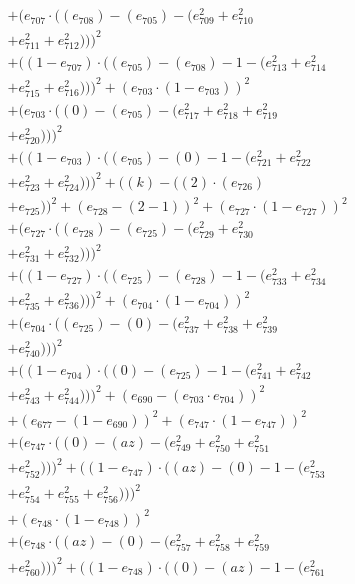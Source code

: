 \documentclass[10pt, a4paper]{article}
\begin{document}
\begin{align*}
& + (e_{707}  \cdot  ((e_{708}) - (e_{705}) - (e_{709}^{2} + e_{710}^{2} \\
& + e_{711}^{2} + e_{712}^{2})))^{2} \\
& + ((1 - e_{707})  \cdot  ((e_{705}) - (e_{708}) - 1 - (e_{713}^{2} + e_{714}^{2} \\
& + e_{715}^{2} + e_{716}^{2})))^{2} + (e_{703}  \cdot  (1 - e_{703}))^{2} \\
& + (e_{703}  \cdot  ((0) - (e_{705}) - (e_{717}^{2} + e_{718}^{2} + e_{719}^{2} \\
& + e_{720}^{2})))^{2} \\
& + ((1 - e_{703})  \cdot  ((e_{705}) - (0) - 1 - (e_{721}^{2} + e_{722}^{2} \\
& + e_{723}^{2} + e_{724}^{2})))^{2} + ((k) - ((2)  \cdot  (e_{726}) \\
& + e_{725}))^{2} + (e_{728} - (2 - 1))^{2} + (e_{727}  \cdot  (1 - e_{727}))^{2} \\
& + (e_{727}  \cdot  ((e_{728}) - (e_{725}) - (e_{729}^{2} + e_{730}^{2} \\
& + e_{731}^{2} + e_{732}^{2})))^{2} \\
& + ((1 - e_{727})  \cdot  ((e_{725}) - (e_{728}) - 1 - (e_{733}^{2} + e_{734}^{2} \\
& + e_{735}^{2} + e_{736}^{2})))^{2} + (e_{704}  \cdot  (1 - e_{704}))^{2} \\
& + (e_{704}  \cdot  ((e_{725}) - (0) - (e_{737}^{2} + e_{738}^{2} + e_{739}^{2} \\
& + e_{740}^{2})))^{2} \\
& + ((1 - e_{704})  \cdot  ((0) - (e_{725}) - 1 - (e_{741}^{2} + e_{742}^{2} \\
& + e_{743}^{2} + e_{744}^{2})))^{2} + (e_{690} - (e_{703}  \cdot  e_{704}))^{2} \\
& + (e_{677} - (1 - e_{690}))^{2} + (e_{747}  \cdot  (1 - e_{747}))^{2} \\
& + (e_{747}  \cdot  ((0) - (az) - (e_{749}^{2} + e_{750}^{2} + e_{751}^{2} \\
& + e_{752}^{2})))^{2} + ((1 - e_{747})  \cdot  ((az) - (0) - 1 - (e_{753}^{2} \\
& + e_{754}^{2} + e_{755}^{2} + e_{756}^{2})))^{2} \\
& + (e_{748}  \cdot  (1 - e_{748}))^{2} \\
& + (e_{748}  \cdot  ((az) - (0) - (e_{757}^{2} + e_{758}^{2} + e_{759}^{2} \\
& + e_{760}^{2})))^{2} + ((1 - e_{748})  \cdot  ((0) - (az) - 1 - (e_{761}^{2} \\

\end{align*}
\end{document}
